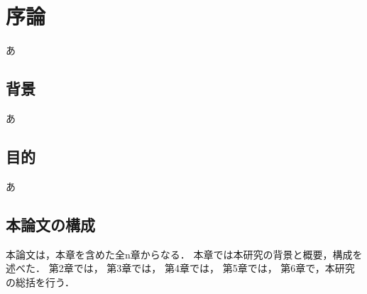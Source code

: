 
\renewcommand{\part}{Contents}
\renewcommand{\prechaptername}{第 }
\renewcommand{\postchaptername}{ 章}


\chapter{序論}
    あ
    
\section{背景}
    あ

\section{目的}
    あ

\section{本論文の構成}

    本論文は，本章を含めた全n章からなる．
    本章では本研究の背景と概要，構成を述べた．
    第2章では，
    第3章では，
    第4章では，
    第5章では，
    第6章で，本研究の総括を行う．

